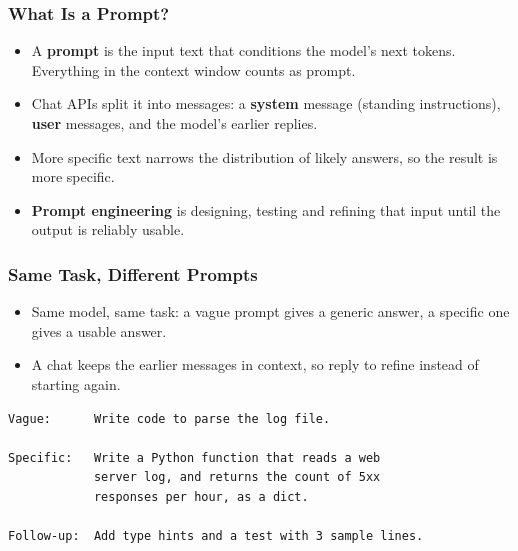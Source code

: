 
\begin{frame}[fragile]\frametitle{What Is a Prompt?}
\begin{itemize}
\item A \textbf{prompt} is the input text that conditions the model's next tokens. Everything in the context window counts as prompt.
\item Chat APIs split it into messages: a \textbf{system} message (standing instructions), \textbf{user} messages, and the model's earlier replies.
\item More specific text narrows the distribution of likely answers, so the result is more specific.
\item \textbf{Prompt engineering} is designing, testing and refining that input until the output is reliably usable.
\end{itemize}
\end{frame}

\begin{frame}[fragile]\frametitle{Same Task, Different Prompts}
\begin{itemize}
\item Same model, same task: a vague prompt gives a generic answer, a specific one gives a usable answer.
\item A chat keeps the earlier messages in context, so reply to refine instead of starting again.
\end{itemize}
\begin{lstlisting}[language={}]
Vague:      Write code to parse the log file.

Specific:   Write a Python function that reads a web
            server log, and returns the count of 5xx
            responses per hour, as a dict.

Follow-up:  Add type hints and a test with 3 sample lines.
\end{lstlisting}
\end{frame}

